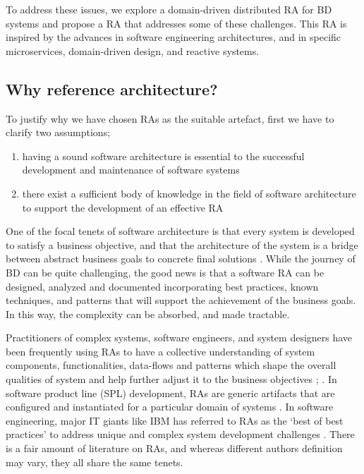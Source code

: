 \documentclass[review]{elsarticle}
\begin{document}
To address these issues, we explore a domain-driven distributed RA for BD systems and propose a RA that addresses some of these challenges. This RA is inspired by the advances in software engineering architectures, and in specific microservices, domain-driven design, and reactive systems. 

\subsection{Why reference architecture?}

To justify why we have chosen RAs as the suitable artefact, first we have to clarify two assumptions;

\begin{enumerate}
    \item having a sound software architecture is essential to the successful development and maintenance of software systems \cite{SoftwareArchitectureKazman}
    \item there exist a sufficient body of knowledge in the field of software architecture to support the development of an effective RA \cite{AtaeiACIS}
\end{enumerate}

One of the focal tenets of software architecture is that every system is developed to satisfy a business objective, and that the architecture of the system is a bridge between abstract business goals to concrete final solutions \cite{SoftwareArchitectureKazman}. While the journey of BD can be quite challenging, the good news is that a software RA can be designed, analyzed and documented incorporating best practices, known techniques, and patterns that will support the achievement of the business goals. In this way, the complexity can be absorbed, and made tractable.

Practitioners of complex systems, software engineers, and system designers have been frequently using RAs to have a collective understanding of system components, functionalities, data-flows and patterns which shape the overall qualities of system and help further adjust it to the business objectives \cite{Cloutier}; \cite{kohler2019towards}. In software product line (SPL) development, RAs are generic artifacts that are configured and instantiated for a particular domain of systems \cite{Derras}. In software engineering, major IT giants like IBM has referred to RAs as the `best of best practices' to address unique and complex system development challenges \cite{Cloutier}. There is a fair amount of literature on RAs, and whereas different authors definition may vary, they all share the same tenets.
\end{document}
